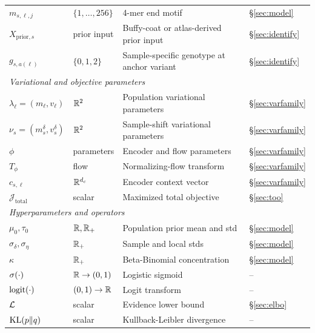\begin{center}
\begin{tabular}{llll}
$m_{s,\ell,j}$ & $\{1,\dots,256\}$ & 4-mer end motif & \S\ref{sec:model} \\
$X_{\mathrm{prior},s}$ & prior input & Buffy-coat or atlas-derived prior input & \S\ref{sec:identify} \\
$g_{s,a(\ell)}$ & $\{0,1,2\}$ & Sample-specific genotype at anchor variant & \S\ref{sec:identify} \\
\midrule
\multicolumn{4}{l}{\emph{Variational and objective parameters}} \\
$\lambda_\ell=(m_\ell,v_\ell)$ & $\mathbb{R}^2$ & Population variational parameters & \S\ref{sec:varfamily} \\
$\nu_s=(m_s^\delta,v_s^\delta)$ & $\mathbb{R}^2$ & Sample-shift variational parameters & \S\ref{sec:varfamily} \\
$\phi$ & parameters & Encoder and flow parameters & \S\ref{sec:varfamily} \\
$T_\phi$ & flow & Normalizing-flow transform & \S\ref{sec:varfamily} \\
$c_{s,\ell}$ & $\mathbb{R}^{d_c}$ & Encoder context vector & \S\ref{sec:varfamily} \\
$\mathcal{J}_{\mathrm{total}}$ & scalar & Maximized total objective & \S\ref{sec:too} \\
\midrule
\multicolumn{4}{l}{\emph{Hyperparameters and operators}} \\
$\mu_0,\tau_0$ & $\mathbb{R},\mathbb{R}_+$ & Population prior mean and std & \S\ref{sec:model} \\
$\sigma_\delta,\sigma_\eta$ & $\mathbb{R}_+$ & Sample and local stds & \S\ref{sec:model} \\
$\kappa$ & $\mathbb{R}_+$ & Beta-Binomial concentration & \S\ref{sec:model} \\
$\sigma(\cdot)$ & $\mathbb{R}\to(0,1)$ & Logistic sigmoid & -- \\
$\mathrm{logit}(\cdot)$ & $(0,1)\to\mathbb{R}$ & Logit transform & -- \\
$\mathcal{L}$ & scalar & Evidence lower bound & \S\ref{sec:elbo} \\
$\mathrm{KL}(p\|q)$ & scalar & Kullback-Leibler divergence & -- \\
\bottomrule
\end{tabular}
\end{center}

